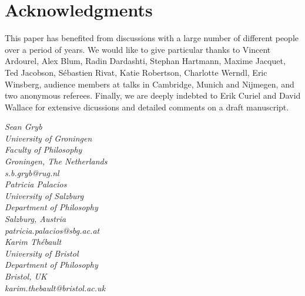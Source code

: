 \documentclass[12pt,english]{article}
\numberwithin{equation}{section}
\begin{document}
\section*{Acknowledgments}
This paper has benefited from discussions with a large number of different people over a period of years. We would like to give particular thanks to Vincent Ardourel, Alex Blum, Radin Dardashti, Stephan Hartmann, Maxime Jacquet, Ted Jacobson, S\'ebastien Rivat, Katie Robertson, Charlotte Werndl, Eric Winsberg, audience members at talks in Cambridge, Munich and Nijmegen, and two anonymous referees. Finally, we are deeply indebted to Erik Curiel and David Wallace for extensive dicussions and detailed comments on a draft manuscript. 

\begin{flushright}
\emph{
  Sean Gryb\\
  University of Groningen\\
  Faculty of Philosophy \\
  Groningen, The Netherlands\\
  s.b.gryb@rug.nl\\
}
\bigskip
\emph{
  Patricia Palacios\\
  University of Salzburg\\
  Department of Philosophy\\
  Salzburg, Austria\\
  patricia.palacios@sbg.ac.at
}\\
\bigskip
\emph{
  Karim Th\'ebault\\
  University of Bristol\\
  Department of Philosophy\\
  Bristol, UK\\
  karim.thebault@bristol.ac.uk
}
\end{flushright}


{}
\end{document}
